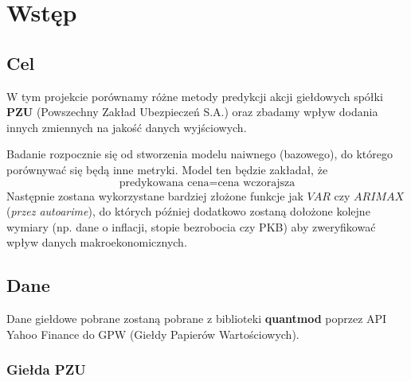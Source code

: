 \documentclass[
  polish,
  letterpaper,
  DIV=11,
  numbers=noendperiod]{scrartcl}
\begin{document}
\section{Wstęp}\label{wstux119p}

\subsection{Cel}\label{cel}

W tym projekcie porównamy różne metody predykcji akcji giełdowych spółki
\textbf{PZU} (Powszechny Zakład Ubezpieczeń S.A.) oraz zbadamy wpływ
dodania innych zmiennych na jakość danych wyjściowych.

Badanie rozpocznie się od stworzenia modelu naiwnego (bazowego), do
którego porównywać się będą inne metryki. Model ten będzie zakładał, że
\[\text{predykowana cena} = \text{cena wczorajsza}\] Następnie zostana
wykorzystane bardziej złożone funkcje jak \(VAR\) czy \(ARIMAX\)
(\emph{przez autoarime}), do których później dodatkowo zostaną dołożone
kolejne wymiary (np. dane o inflacji, stopie bezrobocia czy PKB) aby
zweryfikować wpływ danych makroekonomicznych.

\subsection{Dane}\label{dane}

Dane giełdowe pobrane zostaną pobrane z biblioteki \textbf{quantmod}
poprzez API Yahoo Finance do GPW (Giełdy Papierów Wartościowych).

\subsubsection{Giełda PZU}\label{gieux142da-pzu}
\end{document}

